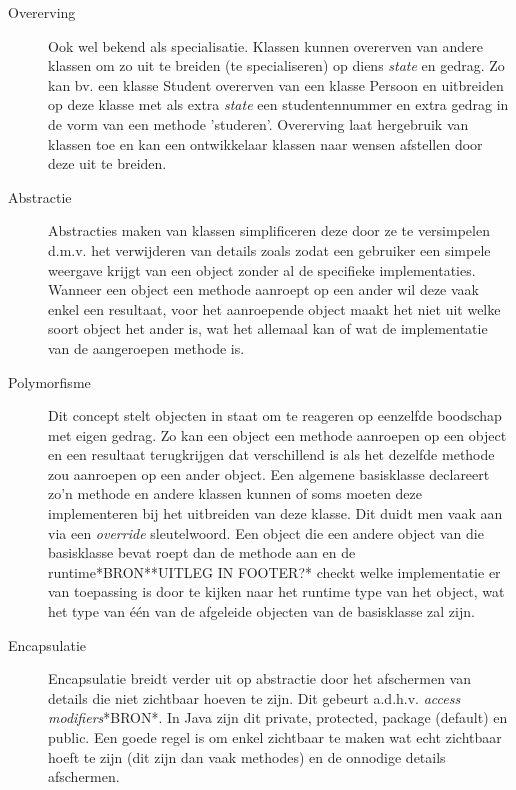 \begin{description}
   \item[Overerving] Ook wel bekend als specialisatie. Klassen kunnen overerven van andere klassen om zo uit te breiden (te specialiseren) op diens \textit{state} en gedrag. Zo kan bv. een klasse Student overerven van een klasse Persoon en uitbreiden op deze klasse met als extra \textit{state} een studentennummer en extra gedrag in de vorm van een methode 'studeren'. 
    Overerving laat hergebruik van klassen toe en kan een ontwikkelaar klassen naar wensen afstellen door deze uit te breiden. 
    \item[Abstractie] Abstracties maken van klassen simplificeren deze door ze te versimpelen d.m.v. het verwijderen van details zoals zodat een gebruiker een simpele weergave krijgt van een object zonder al de specifieke implementaties. Wanneer een object een methode aanroept op een ander wil deze vaak enkel een resultaat, voor het aanroepende object maakt het niet uit welke soort object het ander is, wat het allemaal kan of wat de implementatie van de aangeroepen methode is.
    \item[Polymorfisme] Dit concept stelt objecten in staat om te reageren op eenzelfde boodschap met eigen gedrag. Zo kan een object een methode aanroepen op een object en een resultaat terugkrijgen dat verschillend is als het dezelfde methode zou aanroepen op een ander object. Een algemene basisklasse declareert zo'n methode en andere klassen kunnen of soms moeten deze implementeren bij het uitbreiden van deze klasse. Dit duidt men vaak aan via een \textit{override} sleutelwoord. Een object die een andere object van die basisklasse bevat roept dan de methode aan en de runtime*BRON**UITLEG IN FOOTER?* checkt welke implementatie er van toepassing is door te kijken naar het runtime type van het object, wat het type van één van de afgeleide objecten van de basisklasse zal zijn.
    \item[Encapsulatie] Encapsulatie breidt verder uit op abstractie door het afschermen van details die niet zichtbaar hoeven te zijn. Dit gebeurt a.d.h.v. \textit{access modifiers}*BRON*. In Java zijn dit private, protected, package (default) en public. Een goede regel is om enkel zichtbaar te maken wat echt zichtbaar hoeft te zijn (dit zijn dan vaak methodes) en de onnodige details afschermen.
\end{description}

